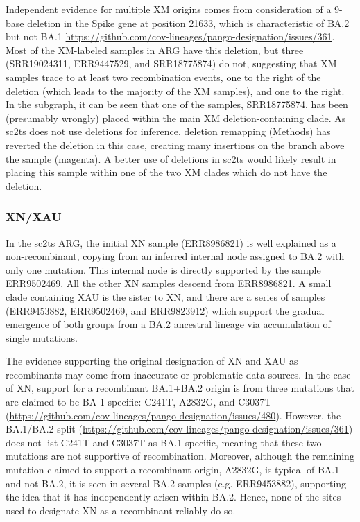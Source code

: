 \documentclass[12pt]{article}
\begin{document}
Independent evidence for multiple XM origins
comes from consideration of a 9-base deletion
in the Spike gene at position 21633,
which is characteristic of BA.2 but not BA.1
\url{https://github.com/cov-lineages/pango-designation/issues/361}.
Most of the XM-labeled samples in ARG have this deletion,
but three (SRR19024311, ERR9447529, and SRR18775874) do not,
suggesting that XM samples trace to at least two recombination events,
one to the right of the deletion
(which leads to the majority of the XM samples), and one to the right.
In the subgraph, it can be seen that one of the samples, SRR18775874,
has been (presumably wrongly) placed
within the main XM deletion-containing clade.
As sc2ts does not use deletions for inference,
deletion remapping (Methods) has reverted the deletion in this case,
creating many insertions on the branch above the sample (magenta).
A better use of deletions in sc2ts would likely result
in placing this sample within one of the two XM clades
which do not have the deletion.


\subsubsection{XN/XAU}
\label{sec:dd_xn}

In the sc2ts ARG, the initial XN sample (ERR8986821)
is well explained as a non-recombinant,
copying from an inferred internal node
assigned to BA.2 with only one mutation.
This internal node is directly supported by the sample ERR9502469.
All the other XN samples descend from ERR8986821.
A small clade containing XAU is the sister to XN, and
there are a series of samples (ERR9453882, ERR9502469, and ERR9823912)
which support the gradual emergence of both groups
from a BA.2 ancestral lineage via accumulation of single mutations.

The evidence supporting the original designation of
XN and XAU as recombinants may come
from inaccurate or problematic data sources.
In the case of XN, support for a recombinant BA.1+BA.2 origin
is from three mutations that are claimed to be BA-1-specific:
C241T, A2832G, and C3037T
(\url{https://github.com/cov-lineages/pango-designation/issues/480}).
However, the BA.1/BA.2 split
(\url{https://github.com/cov-lineages/pango-designation/issues/361})
does not list C241T and C3037T as BA.1-specific,
meaning that these two mutations are not supportive of recombination.
Moreover, although the remaining mutation
claimed to support a recombinant origin, A2832G,
is typical of BA.1 and not BA.2,
it is seen in several BA.2 samples (e.g. ERR9453882),
supporting the idea that it has independently arisen within BA.2.
Hence, none of the sites used to designate XN as a recombinant reliably do so.
\end{document}
